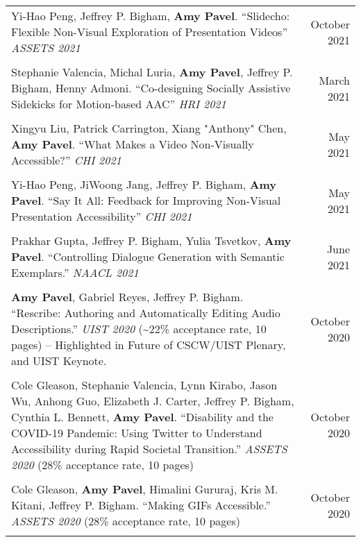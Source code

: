 \begin{longtable}{Xr}
	Yi-Hao Peng, Jeffrey P. Bigham, \textbf{Amy Pavel}. ``Slidecho: Flexible Non-Visual Exploration of Presentation Videos'' \textit{ASSETS 2021} & October 2021 \\
	\\

	Stephanie Valencia, Michal Luria, \textbf{Amy Pavel}, Jeffrey P. Bigham, Henny Admoni. ``Co-designing Socially Assistive Sidekicks for Motion-based AAC'' \textit{HRI 2021} & March 2021 \\
	\\

	Xingyu Liu, Patrick Carrington, Xiang "Anthony" Chen, \textbf{Amy Pavel}. ``What Makes a Video Non-Visually Accessible?'' \textit{CHI 2021} & May 2021 \\
	\\

	Yi-Hao Peng, JiWoong Jang, Jeffrey P. Bigham, \textbf{Amy Pavel}. ``Say It All: Feedback for Improving Non-Visual Presentation Accessibility'' \textit{CHI 2021} & May 2021 \\
	\\

	Prakhar Gupta, Jeffrey P. Bigham, Yulia Tsvetkov, \textbf{Amy Pavel}. ``Controlling Dialogue Generation with Semantic Exemplars.'' \textit{NAACL 2021} & June 2021 \\
	\\

	\textbf{Amy Pavel}, Gabriel Reyes, Jeffrey P. Bigham. ``Rescribe: Authoring and Automatically Editing Audio Descriptions.'' \textit{UIST 2020} (\textasciitilde22\% acceptance rate, 10 pages) -- Highlighted in Future of CSCW/UIST Plenary, and UIST Keynote. & October 2020 \\
	\\

	Cole Gleason, Stephanie Valencia, Lynn Kirabo, Jason Wu, Anhong Guo, Elizabeth J. Carter, Jeffrey P. Bigham, Cynthia L. Bennett, \textbf{Amy Pavel}. ``Disability and the COVID-19 Pandemic: Using Twitter to Understand Accessibility during Rapid Societal Transition.'' \textit{ASSETS 2020} (28\% acceptance rate, 10 pages) & October 2020 \\
	\\

	Cole Gleason, \textbf{Amy Pavel}, Himalini Gururaj, Kris M. Kitani, Jeffrey P. Bigham. ``Making GIFs Accessible.'' \textit{ASSETS 2020} (28\% acceptance rate, 10 pages) & October 2020 \\
	\\


\end{longtable}

